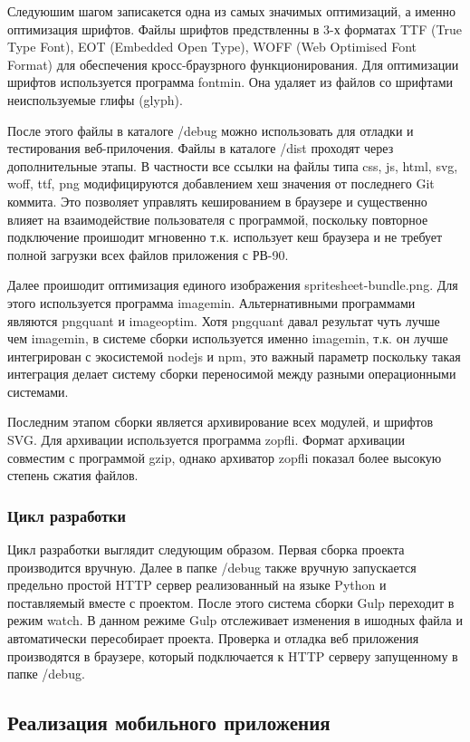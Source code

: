 Следуюшим шагом записакется одна из самых значимых оптимизаций, а именно оптимизация шрифтов. Файлы шрифтов предствленны в 3-х форматах TTF (True Type Font), EOT (Embedded Open Type), WOFF (Web Optimised Font Format) для обеспечения кросс-браузрного функционирования. Для оптимизации шрифтов используется программа fontmin. Она удаляет из файлов со шрифтами неиспользуемые глифы (glyph).

После этого файлы в каталоге /debug можно использовать для отладки и тестирования веб-прилочения. Файлы в каталоге /dist проходят через дополнительные этапы. В частности все ссылки на файлы типа css, js, html, svg, woff, ttf, png модифицируются добавлением хеш значения от последнего Git коммита. Это позволяет управлять кешированием в браузере и существенно влияет на взаимодействие пользователя с программой, поскольку повторное подключение проишодит мгновенно т.к. использует кеш браузера и не требует полной загрузки всех файлов приложения с РВ-90.    

Далее проишодит оптимизация единого изображения spritesheet-bundle.png. Для этого используется программа imagemin. Альтернативными программами являются pngquant и imageoptim. Хотя pngquant давал результат чуть лучше чем imagemin, в системе сборки используется именно imagemin, т.к. он лучше интегрирован с экосистемой nodejs и npm, это важный параметр поскольку такая интеграция делает систему сборки переносимой между разными операционными системами. 

Последним этапом сборки является архивирование всех модулей, и шрифтов SVG. Для архивации используется программа zopfli. Формат архивации совместим с программой gzip, однако архиватор zopfli показал более высокую степень сжатия файлов.

\subsubsection{Цикл разработки}
Цикл разработки выглядит следующим образом. Первая сборка проекта производится вручную. Далее в папке /debug также вручную запускается предельно простой HTTP сервер реализованный на языке Python и поставляемый вместе с проектом. После этого система сборки Gulp переходит в режим watch. В данном режиме Gulp отслеживает изменения в ишодных файла и автоматически пересобирает проекта. Проверка и отладка веб приложения производятся в браузере, который подключается к HTTP серверу запущенному в папке /debug. 


\subsection{Реализация мобильного приложения}

